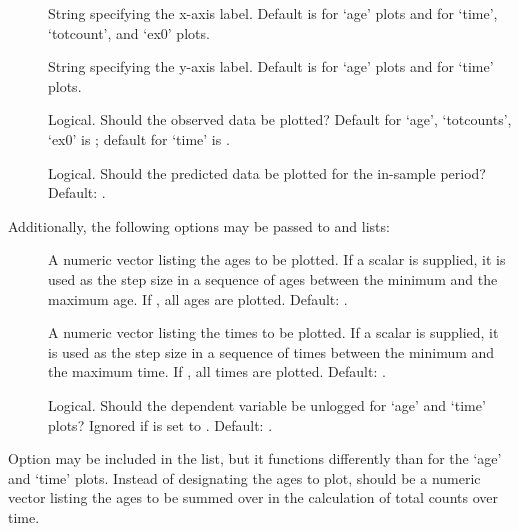 \begin{Details}
\begin{description}

\item[] String specifying the x-axis label. Default is  for `age' plots and  for `time', `totcount', and `ex0' plots.

\item[] String specifying the y-axis label. Default is  for `age' plots and  for `time' plots.

\item[] Logical. Should the observed data be plotted? Default for `age', `totcounts', `ex0' is ; default for  `time' is .

\item[] Logical. Should the predicted data be plotted for the in-sample period? Default: .

\end{description}


Additionally, the following options may be passed to  and  lists:
\begin{description}

\item[] A numeric vector listing the ages to be plotted. If a scalar is supplied, it is used as the step size in a sequence of ages between the minimum and the maximum age. If , all ages are plotted. Default: .

\item[] A numeric vector listing the times to be plotted. If a scalar is supplied, it is used as the step size in a sequence of times between the minimum and the maximum time. If , all times are plotted. Default: .

\item[] Logical. Should the dependent variable be unlogged for `age' and `time' plots? Ignored if  is set to . Default: .

\end{description}
 

Option  may be included in the  list, but it functions differently than for the `age' and `time' plots. Instead of designating the ages to plot,  should be a numeric vector listing the ages to be summed over in the calculation of total counts over time. 


\end{Details}
